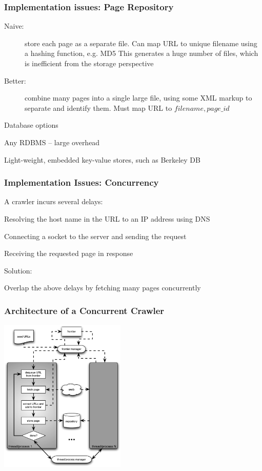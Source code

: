 \documentclass{beamer}
\begin{document}
\begin{frame} \frametitle{Implementation issues: Page Repository}

\begin{description}
\item [Naive:] store each page as a separate file.
Can map URL to unique filename using a hashing function, e.g. MD5
This generates a huge number of files, which is inefficient from the storage perspective

\item [Better:] combine many pages into a single large file, using some XML markup to separate and identify them.
Must map URL to ${filename, page\_id}$
\end{description}

\begin{block}{Database options}

Any RDBMS -- large overhead

Light-weight, embedded key-value stores, such as Berkeley DB

\end{block}

\end{frame}

\begin{frame} \frametitle{Implementation Issues: Concurrency}

\begin{block}{A crawler incurs several delays:}

Resolving the host name in the URL to an IP address using DNS

Connecting a socket to the server and sending the request

Receiving the requested page in response
\end{block}

\begin{block}{Solution:} 

Overlap the above delays by fetching many pages concurrently
\end{block}


\end{frame}

\begin{frame} \frametitle{Architecture of a Concurrent Crawler}


      \includegraphics[width=6cm]{concurrent-crawler-arch}

\end{frame}
\end{document}
